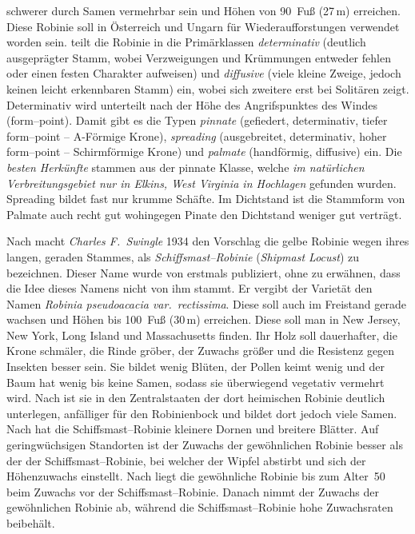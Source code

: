 \documentclass[twocolumn]{scrartcl}
\begin{document}
schwerer durch Samen vermehrbar sein und Höhen von 90~Fuß (27\,m)
erreichen. Diese Robinie soll in Österreich und Ungarn für
Wiederaufforstungen verwendet worden sein. \citet{hopp1941robinie} teilt
die Robinie in die Primärklassen \emph{determinativ} (deutlich ausgeprägter
Stamm, wobei Verzweigungen und Krümmungen entweder fehlen oder
einen festen Charakter aufweisen) und \emph{diffusive} (viele kleine Zweige,
jedoch keinen leicht erkennbaren Stamm) ein, wobei sich zweitere erst
bei Solitären zeigt. Determinativ wird unterteilt nach der Höhe des
Angrifspunktes des Windes (form--point). Damit gibt es die Typen
\emph{pinnate} (gefiedert, determinativ, tiefer form--point --
A-Förmige Krone), \emph{spreading} (ausgebreitet, determinativ, hoher
form--point -- Schirmförmige Krone) und \emph{palmate} (handförmig,
diffusive) ein. Die \emph{besten Herkünfte} stammen aus der pinnate Klasse,
welche \emph{im natürlichen Verbreitungsgebiet nur in Elkins, West Virginia
in Hochlagen} gefunden wurden. Spreading bildet fast nur krumme
Schäfte. Im Dichtstand ist die Stammform von Palmate auch recht gut
wohingegen Pinate den Dichtstand weniger gut verträgt.

Nach \citet{detwiler1937robinie} macht \emph{Charles F.\ Swingle} 1934
den Vorschlag die gelbe Robinie wegen ihres langen, geraden Stammes,
als \emph{Schiffsmast--Robinie} (\emph{Shipmast Locust}) zu
bezeichnen. Dieser Name wurde von \citet{raber1936shipmast} erstmals
publiziert, ohne zu erwähnen, dass die Idee dieses Namens nicht von ihm
stammt. Er vergibt der Varietät den Namen \emph{Robinia pseudoacacia
var.\ rectissima}. Diese soll auch im Freistand gerade wachsen und
Höhen bis 100~Fuß (30\,m) erreichen. Diese soll man in New Jersey, New
York, Long Island und Massachusetts finden. Ihr Holz soll dauerhafter,
die Krone schmäler, die Rinde gröber, der Zuwachs größer und die
Resistenz gegen Insekten besser sein. Sie bildet wenig Blüten, der
Pollen keimt wenig und der Baum hat wenig bis keine Samen, sodass sie
überwiegend vegetativ vermehrt wird.
Nach \citet[S.~321]{usForestService1948seedManual} ist sie in den
Zentralstaaten der dort heimischen Robinie deutlich unterlegen,
anfälliger für den Robinienbock und bildet dort jedoch viele Samen.
Nach \citet{hopp1941robinieUnterschied} hat die
Schiffsmast--Robinie kleinere Dornen und breitere Blätter. Auf
geringwüchsigen Standorten ist der Zuwachs der gewöhnlichen Robinie
besser als der der Schiffsmast--Robinie, bei welcher der Wipfel
abstirbt und sich der Höhenzuwachs einstellt.
Nach \citet{hopp1947robinie} liegt die gewöhnliche Robinie bis zum Alter~50
beim Zuwachs vor der
Schiffsmast--Robinie. Danach nimmt der Zuwachs der gewöhnlichen
Robinie ab, während die Schiffsmast--Robinie hohe Zuwachsraten
beibehält.
\end{document}
